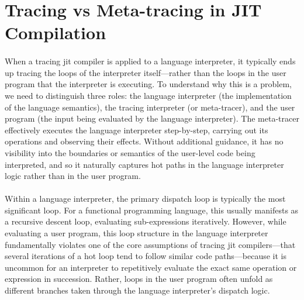 


    \section[\texorpdfstring{Tracing vs Meta-tracing in JIT Compilation}{Tracing vs Meta-tracing}]{Tracing vs Meta-tracing in JIT Compilation}

        \paragraph{}%
            When a tracing \gls{jit} compiler is applied to a language interpreter, it typically ends up tracing the loops of the interpreter itself—rather than the loops in the user program that the interpreter is executing. To understand why this is a problem, we need to distinguish three roles: the language interpreter (the implementation of the language semantics), the tracing interpreter (or meta-tracer), and the user program (the input being evaluated by the language interpreter). The meta-tracer effectively executes the language interpreter step-by-step, carrying out its operations and observing their effects. Without additional guidance, it has no visibility into the boundaries or semantics of the user-level code being interpreted, and so it naturally captures hot paths in the language interpreter logic rather than in the user program.

        \paragraph{}%
            Within a language interpreter, the primary dispatch loop is typically the most significant loop. For a functional programming language, this usually manifests as a recursive descent loop, evaluating sub-expressions iteratively. However, while evaluating a user program, this loop structure in the language interpreter fundamentally violates one of the core assumptions of tracing \gls{jit} compilers—that several iterations of a hot loop tend to follow similar code paths—because it is uncommon for an interpreter to repetitively evaluate the exact same operation or expression in succession. Rather, loops in the user program often unfold as different branches taken through the language interpreter’s dispatch logic.

